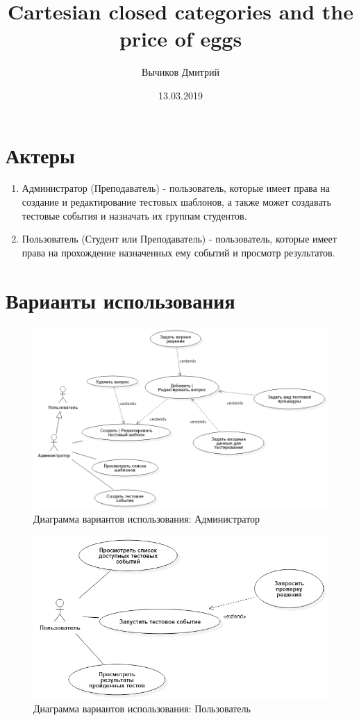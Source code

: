 \documentclass{article}
\title{Cartesian closed categories and the price of eggs}
\author{Вычиков Дмитрий}
\date{13.03.2019}
\begin{document}
    \maketitle
    \section{Актеры}
    \begin{enumerate}
        \item Администратор (Преподаватель) - пользователь, которые имеет 
        права на создание и редактирование тестовых шаблонов, а также может
         создавать тестовые события и назначать их группам студентов.
        \item Пользователь (Студент или Преподаватель) - пользователь, которые
        имеет права на прохождение назначенных ему событий и просмотр результатов.
    \end{enumerate}
    
    \section{Варианты использования}
    \begin{figure}[H]
        \includegraphics[width=\textwidth, center]{UseCase_Admin.png}
        \caption{Диаграмма вариантов использования: Администратор}
    \end{figure}

    \begin{figure}[H]
        \includegraphics[width=\textwidth, center]{UseCase_User.png}
        \caption{Диаграмма вариантов использования: Пользователь}
    \end{figure}
\end{document}
